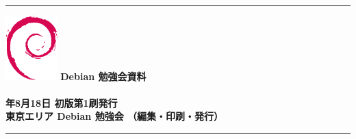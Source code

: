 \documentclass[mingoth,a4paper]{jsarticle}
\newcommand{\debmtgyear}{2007}
\newcommand{\debmtgdate}{18}
\newcommand{\debmtgmonth}{8}
\begin{document}
\begin{minipage}[b]{0.2\hsize}
 \colorbox{dancerlightblue}{}
\end{minipage}
\begin{minipage}[b]{0.8\hsize}

\vspace*{15cm}
{\color{dancerlightblue}\rule{\hsize}{1mm}}
\vspace{2mm}
\includegraphics[width=2cm]{image200502/openlogo-nd.eps}
\noindent \Large \bf Debian 勉強会資料\\ \\
\noindent \normalfont \debmtgyear{}年\debmtgmonth{}月\debmtgdate{}日 \hspace{5mm}  初版第1刷発行\\
\noindent \normalfont 東京エリア Debian 勉強会 （編集・印刷・発行）\\
{\color{dancerdarkblue}\rule{\hsize}{1mm}}
\end{minipage}
\end{document}
